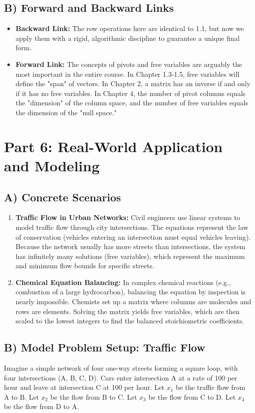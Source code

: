 \documentclass[11pt]{article}
\begin{document}
\subsection{B) Forward and Backward Links}
\begin{itemize}
    \item \textbf{Backward Link:} The row operations here are identical to 1.1, but now we apply them with a rigid, algorithmic discipline to guarantee a unique final form.
    \item \textbf{Forward Link:} The concepts of pivots and free variables are arguably the most important in the entire course. In Chapter 1.3-1.5, free variables will define the "span" of vectors. In Chapter 2, a matrix has an inverse if and only if it has no free variables. In Chapter 4, the number of pivot columns equals the "dimension" of the column space, and the number of free variables equals the dimension of the "null space."
\end{itemize}

\newpage
\section{Part 6: Real-World Application and Modeling}

\subsection{A) Concrete Scenarios}
\begin{enumerate}
    \item \textbf{Traffic Flow in Urban Networks:} Civil engineers use linear systems to model traffic flow through city intersections. The equations represent the law of conservation (vehicles entering an intersection must equal vehicles leaving). Because the network usually has more streets than intersections, the system has infinitely many solutions (free variables), which represent the maximum and minimum flow bounds for specific streets.
    \item \textbf{Chemical Equation Balancing:} In complex chemical reactions (e.g., combustion of a large hydrocarbon), balancing the equation by inspection is nearly impossible. Chemists set up a matrix where columns are molecules and rows are elements. Solving the matrix yields free variables, which are then scaled to the lowest integers to find the balanced stoichiometric coefficients.
\end{enumerate}

\subsection{B) Model Problem Setup: Traffic Flow}
Imagine a simple network of four one-way streets forming a square loop, with four intersections (A, B, C, D). 
Cars enter intersection A at a rate of 100 per hour and leave at intersection C at 100 per hour.
Let $x_1$ be the traffic flow from A to B.
Let $x_2$ be the flow from B to C.
Let $x_3$ be the flow from C to D.
Let $x_4$ be the flow from D to A.
\end{document}
